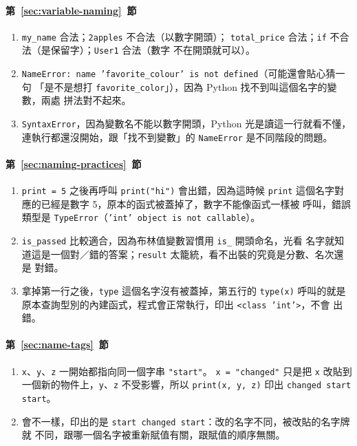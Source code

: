 \paragraph{第~\ref{sec:variable-naming}~節}
\begin{enumerate}
\item \texttt{my\_name} 合法；\texttt{2apples} 不合法（以數字開頭）；
\texttt{total\_price} 合法；\texttt{if} 不合法（是保留字）；\texttt{User1} 合法（數字
不在開頭就可以）。
\item \texttt{NameError: name 'favorite\_colour' is not defined}（可能還會貼心猜一句
「是不是想打 \texttt{favorite\_color}」），因為 Python 找不到叫這個名字的變數，兩處
拼法對不起來。
\item \texttt{SyntaxError}，因為變數名不能以數字開頭，Python 光是讀這一行就看不懂，
連執行都還沒開始，跟「找不到變數」的 \texttt{NameError} 是不同階段的問題。
\end{enumerate}

\paragraph{第~\ref{sec:naming-practices}~節}
\begin{enumerate}
\item \texttt{print = 5} 之後再呼叫 \texttt{print("hi")} 會出錯，因為這時候
\texttt{print} 這個名字對應的已經是數字 5，原本的函式被蓋掉了，數字不能像函式一樣被
呼叫，錯誤類型是 \texttt{TypeError}（\texttt{'int' object is not callable}）。
\item \texttt{is\_passed} 比較適合，因為布林值變數習慣用 \texttt{is\_} 開頭命名，光看
名字就知道這是一個對／錯的答案；\texttt{result} 太籠統，看不出裝的究竟是分數、名次還是
對錯。
\item 拿掉第一行之後，\texttt{type} 這個名字沒有被蓋掉，第五行的 \texttt{type(x)}
呼叫的就是原本查詢型別的內建函式，程式會正常執行，印出 \texttt{<class 'int'>}，不會
出錯。
\end{enumerate}

\paragraph{第~\ref{sec:name-tags}~節}
\begin{enumerate}
\item \texttt{x}、\texttt{y}、\texttt{z} 一開始都指向同一個字串 \texttt{"start"}。
\texttt{x = "changed"} 只是把 \texttt{x} 改貼到一個新的物件上，\texttt{y}、\texttt{z}
不受影響，所以 \texttt{print(x, y, z)} 印出 \texttt{changed start start}。
\item 會不一樣，印出的是 \texttt{start changed start}：改的名字不同，被改貼的名字牌就
不同，跟哪一個名字被重新賦值有關，跟賦值的順序無關。
\end{enumerate}


